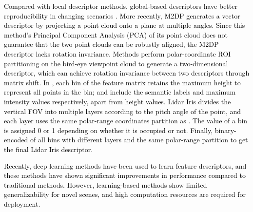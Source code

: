 \documentclass[letterpaper, 10 pt, conference]{ieeeconf}   %
\newcommand\kevin[1]{\textcolor{black}{#1}}
\begin{document}
\kevin{Compared with local descriptor methods, global-based descriptors have better reproducibility in changing scenarios \cite{locus}. More recently, M2DP\cite{M2DP} generates a vector descriptor by projecting a point cloud onto a plane at multiple angles. Since this method's Principal Component Analysis (PCA) of its point cloud does not guarantee that the two point clouds can be robustly aligned, the M2DP descriptor lacks rotation invariance. Methods \cite{kim2018scan,li2021ssc,wang2020intensity} perform polar-coordinate ROI partitioning on the bird-eye viewpoint cloud to generate a two-dimensional descriptor, which can achieve rotation invariance between two descriptors through matrix shift. In \cite{kim2018scan}, each bin of the feature matrix retains the maximum height to represent all points in the bin; \cite{li2021ssc} and \cite{wang2020intensity} include the semantic labels and maximum intensity values respectively, apart from height values. Lidar Iris\cite{wang2020lidar} divides the vertical FOV into multiple layers according to the pitch angle of the point, and each layer uses the same polar-range coordinates partition as \cite{kim2018scan}. The value of a bin is assigned 0 or 1 depending on whether it is occupied or not. Finally, binary-encoded of all bins with different layers and the same polar-range partition to get the final Lidar Iris descriptor.}



\kevin{Recently, deep learning methods \cite{locus, ma2022overlaptransformer, dewan2018learning, yin2017efficient, dube2020segmap, uy2018pointnetvlad, arandjelovic2016netvlad, zhou2021ndt} have been used to learn feature descriptors, and these methods have shown significant improvements in performance compared to traditional methods. However, learning-based methods show limited generalizability for novel scenes, and high computation resources are required for deployment.}
\end{document}
